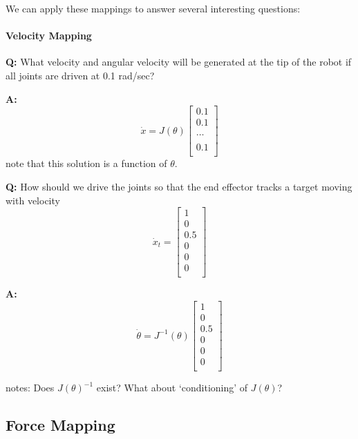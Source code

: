 We can apply these mappings to answer several interesting questions:

\paragraph{Velocity Mapping}

\noindent
{\bf Q:}  What velocity and angular velocity will be generated at the tip
of the robot if all joints are driven at 0.1 rad/sec?

\noindent
{\bf A:}
\[
\dot{x} = J(\theta)
\left [
\begin{array}{c}
0.1 \\[6pt]
0.1 \\[6pt]
 \\[12pt]
\dots \\[12pt]
 \\[6pt]
0.1 \\
\end{array}
\right ]
\]
note that this solution is a function of $\theta$.

\noindent
{\bf Q:} How should we drive the joints so that the end effector tracks a target
moving with velocity
\[
\dot{x}_t =
\left [
\begin{array}{c}
1\\[6pt]
0\\[6pt]
0.5\\[6pt]
0\\[6pt]
0\\[6pt]
0\\[6pt]
\end{array}
\right ]
\]

\noindent
{\bf A:}
\[
\dot{\theta} = J^{-1}(\theta)
\left [
\begin{array}{c}
1\\[6pt]
0\\[6pt]
0.5\\[6pt]
0\\[6pt]
0\\[6pt]
0\\[6pt]
\end{array}
\right ]
\]

notes:  Does $J(\theta)^{-1}$ exist?  What about `conditioning' of $J(\theta)$?

\subsection{Force Mapping}


